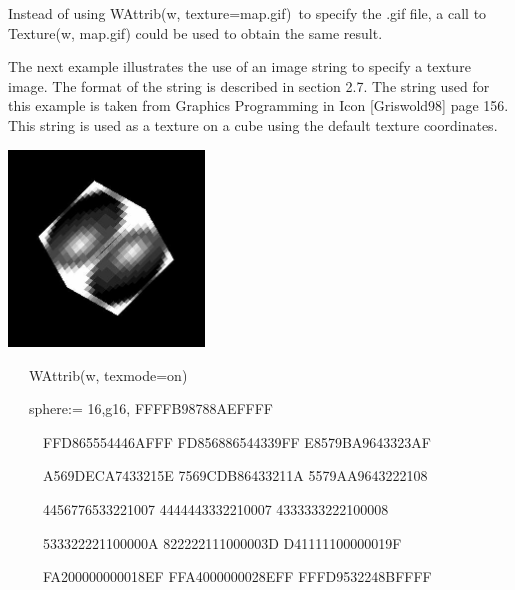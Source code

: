 \documentclass[letterpaper]{article}
\begin{document}
{{
Instead of using \textsf{WAttrib(w, {\textquotedbl}texture=map.gif{\textquotedbl})}\texttt{ }to specify the .gif file, a
call to \textsf{Texture(w, {\textquotedbl}map.gif{\textquotedbl})} could be used to obtain the same result.}


\bigskip

{
The next example illustrates the use of an image string to specify a texture image. The format of the string is
described in section 2.7. The string used for this example is taken from Graphics Programming in Icon [Griswold98] page
156. This string is used as a texture on a cube using the default texture coordinates. }


\bigskip

{\centering  \includegraphics[width=2.0508in,height=2.0571in]{utr9/utr9-img027.jpg} \par}

\bigskip

{\sffamily
\ \ \ WAttrib(w, {\textquotedbl}texmode=on{\textquotedbl})}

{\sffamily
\ \ \ sphere:= {\textquotedbl}16,g16, FFFFB98788AEFFFF{\textquotedbl} {\textbar}{\textbar}}

{\sffamily
\ \ \ \ \ {\textquotedbl}FFD865554446AFFF FD856886544339FF E8579BA9643323AF{\textquotedbl}{\textbar}{\textbar}}

{\sffamily
\ \ \ \ \ {\textquotedbl}A569DECA7433215E 7569CDB86433211A 5579AA9643222108{\textquotedbl}{\textbar}{\textbar}}

{\sffamily
\ \ \ \ \ {\textquotedbl}4456776533221007 4444443332210007 4333333222100008{\textquotedbl}{\textbar}{\textbar}}

{\sffamily
\ \ \ \ \ {\textquotedbl}533322221100000A 822222111000003D D41111100000019F{\textquotedbl}{\textbar}{\textbar}}

{\sffamily
\ \ \ \ \ {\textquotedbl}FA200000000018EF FFA4000000028EFF FFFD9532248BFFFF{\textquotedbl}}

}
\end{document}
